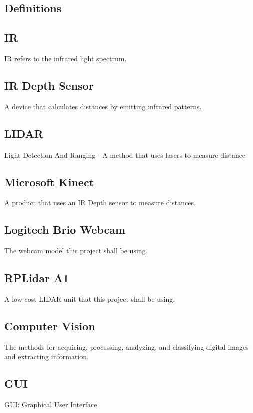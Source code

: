 \documentclass[onecolumn, draftclsnofoot,10pt, compsoc]{IEEEtran}
\begin{document}
\begin{singlespace}
	\section{Definitions}
		\subsection{IR}\label{def:IR}
		IR refers to the infrared light spectrum.

		\subsection{IR Depth Sensor}\label{def:depthsensor}
		A device that calculates distances by emitting infrared patterns. 
		
		\subsection{LIDAR}\label{def:lidar}
		Light Detection And Ranging - A method that uses lasers to measure distance
		
		\subsection{Microsoft Kinect}\label{def:kinect}
		A product that uses an IR Depth sensor to measure distances.
		
		\subsection{Logitech Brio Webcam}\label{def:brio}
		The webcam model this project shall be using.
		
		\subsection{RPLidar A1}\label{def:rplidar}
		A low-cost LIDAR unit that this project shall be using.
		
		\subsection{Computer Vision }\label{def:vision}
		The methods for acquiring, processing, analyzing, and classifying digital images and extracting information.
		
		\subsection{GUI}\label{def:gui}
		GUI: Graphical User Interface
		

\end{singlespace}
\end{document}
